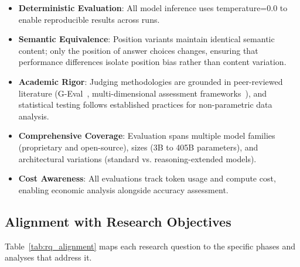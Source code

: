 \begin{itemize}
    \item \textbf{Deterministic Evaluation}: All model inference uses temperature=0.0 to enable reproducible results across runs.

    \item \textbf{Semantic Equivalence}: Position variants maintain identical semantic content; only the position of answer choices changes, ensuring that performance differences isolate position bias rather than content variation.

    \item \textbf{Academic Rigor}: Judging methodologies are grounded in peer-reviewed literature (G-Eval~\citep{liu2023geval}, multi-dimensional assessment frameworks~\citep{lin2023multidim}), and statistical testing follows established practices for non-parametric data analysis.

    \item \textbf{Comprehensive Coverage}: Evaluation spans multiple model families (proprietary and open-source), sizes (3B to 405B parameters), and architectural variations (standard vs. reasoning-extended models).

    \item \textbf{Cost Awareness}: All evaluations track token usage and compute cost, enabling economic analysis alongside accuracy assessment.
\end{itemize}

\subsection{Alignment with Research Objectives}

Table~\ref{tab:rq_alignment} maps each research question to the specific phases and analyses that address it.

